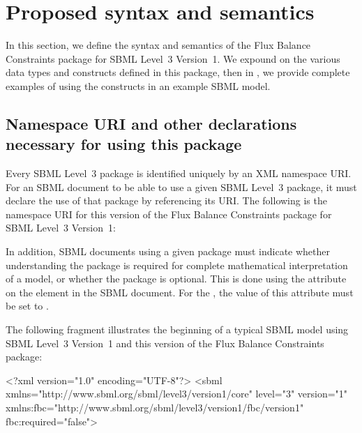 
\section{Proposed syntax and semantics}
\label{syntax}

In this section, we define the syntax and semantics of the Flux Balance
Constraints package for SBML Level~3 Version~1.  We expound on the various
data types and constructs defined in this package, then in ,
we provide complete examples of using the constructs in an example SBML
model.

\subsection{Namespace URI and other declarations necessary for using this
package}
\label{xml-namespace}

Every SBML Level~3 package is identified uniquely by an XML namespace URI.
For an SBML document to be able to use a given SBML Level~3 package, it
must declare the use of that package by referencing its URI.  The following
is the namespace URI for this version of the Flux Balance Constraints
package for SBML Level~3 Version~1:
\begin{center}
\end{center}

In addition, SBML documents using a given package must indicate whether understanding the package is required for complete mathematical interpretation of a model, or whether the package is optional.  This is done using the attribute  on the  element in the SBML document.  For the \FBCPackage, the value of this attribute must be set to .

The following fragment illustrates the beginning of a typical SBML model
using SBML Level~3 Version~1 and this version of the Flux Balance
Constraints package:

\begin{example}
<?xml version="1.0" encoding="UTF-8"?>
 <sbml xmlns="http://www.sbml.org/sbml/level3/version1/core" level="3" version="1"
   xmlns:fbc="http://www.sbml.org/sbml/level3/version1/fbc/version1" fbc:required="false">
\end{example}

